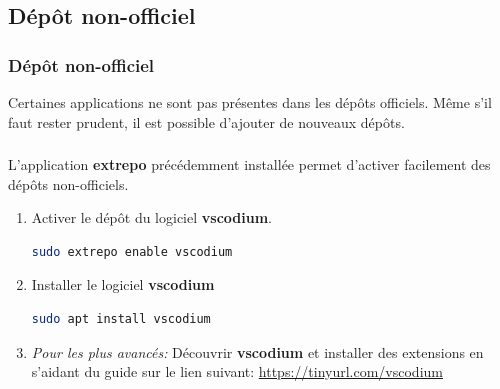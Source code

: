 \documentclass[svgnames,11pt]{beamer}
\begin{document}
\subsection{Dépôt non-officiel}
\begin{frame}
    \frametitle{Dépôt non-officiel}

    Certaines applications ne sont pas présentes dans les dépôts officiels. Même s'il faut rester prudent, il est possible d'ajouter de nouveaux dépôts.

\end{frame}
\begin{frame}[fragile]
    \frametitle{}
L'application \textbf{extrepo} précédemment installée permet d'activer facilement des dépôts non-officiels.
\begin{activite}
\begin{enumerate}
\item Activer le dépôt du logiciel \textbf{vscodium}.
\begin{lstlisting}[language=bash , basicstyle=\ttfamily\small, xleftmargin=2em, xrightmargin=2em]
sudo extrepo enable vscodium
\end{lstlisting}
\item Installer le logiciel \textbf{vscodium}
\begin{lstlisting}[language=bash , basicstyle=\ttfamily\small, xleftmargin=2em, xrightmargin=2em]
sudo apt install vscodium
\end{lstlisting} 
\item \emph{Pour les plus avancés:} Découvrir \textbf{vscodium} et installer des extensions en s'aidant du guide sur le lien suivant: \url{https://tinyurl.com/vscodium}
\end{enumerate}
\end{activite}

\end{frame}
\end{document}
